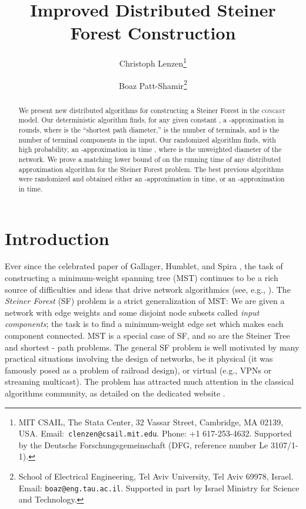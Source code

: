 \documentclass[letterpaper,11pt]{article}
\newcommand{\Congest}{\textsc{congest}\xspace}
\begin{document}
\setcounter{tocdepth}{2}

\title{\textbf{Improved Distributed Steiner Forest Construction}
}

\author{
Christoph Lenzen\thanks{MIT CSAIL, The Stata Center, 32 Vassar Street,
Cambridge, MA 02139, USA.
\hbox{Email: {\tt clenzen@csail.mit.edu}.} Phone: +1 617-253-4632.
Supported by the Deutsche Forschungsgemeinschaft (DFG, reference
number Le 3107/1-1).}
\and 
Boaz Patt-Shamir\thanks{School of Electrical Engineering, Tel Aviv
  University, Tel Aviv 69978, Israel. Email:
  \texttt{boaz@eng.tau.ac.il}. Supported in part by Israel
  Ministry for Science and Technology.}
}

\date{}


\begin{titlepage}

\setcounter{page}{0}

\maketitle





\begin{abstract}
  We present new distributed algorithms for constructing a Steiner Forest in the
  \Congest model. Our deterministic algorithm finds, for any given constant
  , a -approximation in
   rounds, where  is the ``shortest path
  diameter,''  is the number of terminals, and  is the number of terminal
  components in the input. Our randomized algorithm finds, with high
  probability, an -approximation in time , where  is the unweighted diameter of the network. We prove a
  matching lower bound of on the running time of any distributed approximation
  algorithm for the Steiner Forest problem. The best previous algorithms were
  randomized and obtained either an -approximation in 
  time, or an -approximation in  time.
\end{abstract} 
\thispagestyle{empty}
\end{titlepage}

\section{Introduction}
Ever since the celebrated paper of Gallager, Humblet, and Spira \cite{GHS-83},
the task of constructing a minimum-weight spanning tree (MST) continues to be
a rich source of difficulties and ideas that drive network algorithmics (see,
e.g., \cite{Elkin-MST,GarayKP-98,LotkerPP,PelegR-00}).
The \emph{Steiner Forest} (SF) problem is a strict generalization of MST: We are
given a network with edge weights and some disjoint node subsets called
\emph{input components}; the task is to find a minimum-weight edge set which
makes each component connected. MST is a special case of SF, and so are the
Steiner Tree and shortest - path problems.
The general SF problem is well motivated by many practical situations involving
the design of networks, be it physical (it was famously posed as a problem of
railroad design), or virtual (e.g., VPNs or streaming multicast). The problem
has attracted much attention in the classical algorithms community, as detailed
on the dedicated website \cite{Steiner-site}.
\end{document}
